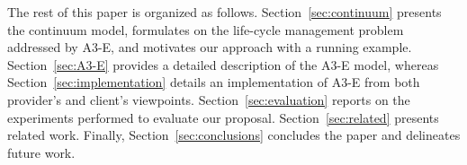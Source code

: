




The rest of this paper is organized as follows. Section~\ref{sec:continuum} presents the continuum model, formulates on the life-cycle management problem addressed by A3-E, and motivates our approach with a running example.
Section~\ref{sec:A3-E} provides a detailed description of the A3-E model, whereas Section~\ref{sec:implementation} details an implementation of A3-E from both provider's and client's viewpoints. Section~\ref{sec:evaluation} reports on the experiments performed to evaluate our proposal. Section~\ref{sec:related} presents related work. Finally, Section~\ref{sec:conclusions} concludes the paper and delineates future work.

